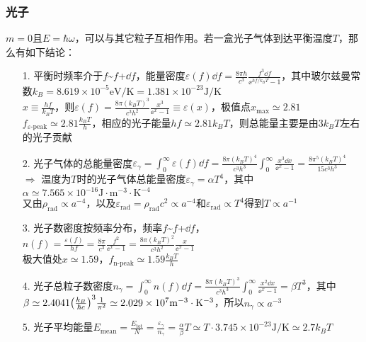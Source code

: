 \subsubsection{光子}
\par 
$m = 0$且$E = \hbar \omega$，可以与其它粒子互相作用。若一盒光子气体到达平衡温度$T$，那么有如下结论：
\begin{itemize}
	\item[1. ] 平衡时频率介于$f$\textasciitilde$f$+$\dd f$，能量密度$\varepsilon(f) \dd f =\frac{8 \pi h}{c^3} \frac{f^3 \dd f}{\ee^{h f/k_B T } - 1}$，其中玻尔兹曼常数$k_B = 8.619 \times 10^{-5} \mathrm{eV/K} = 1.381 \times 10^{-23} \mathrm{J/K}$ \\
	$x \equiv \frac{h f}{k_B T}$，则$\varepsilon(f) = \frac{8 \pi (k_B T)^3}{c^3 h^2} \frac{x^3}{\ee^x - 1} \equiv \varepsilon(x)$，极值点$x_{\text{max}} \simeq 2.81$ \\
	$f_{\text{$\varepsilon$-peak}} \simeq 2.81 \frac{k_B T}{h}$，相应的光子能量$h f \simeq 2.81 k_B T$，则总能量主要是由$3 k_B T$左右的光子贡献
	
	\item[2. ] 光子气体的总能量密度$\varepsilon_{\gamma} = \int_{0}^{\infty} \varepsilon(f) \dd f = \frac{8 \pi (k_B T)^4}{c^3 h^3} \int_{0}^{\infty} \frac{x^3 \dd x}{\ee^x - 1} = \frac{8 \pi^5 (k_B T)^4 }{15 c^3 h^3}$ \\
	$\Rightarrow$ 温度为$T$时的光子气体总能量密度$\varepsilon_{\gamma} = \alpha T^4$，其中$\alpha \simeq 7.565 \times 10^{-16} \mathrm{J \cdot m^{-3} \cdot K^{-4}}$ \\
	又由$\rho_{\text{rad}} \propto a^{-4}$，以及$\varepsilon_{\text{rad}} = \rho_{\text{rad}} c^2 \propto a^{-4}$和$\varepsilon_{\text{rad}} \propto T^4$得到$T \propto a^{-1}$
	
	\item[3. ] 光子数密度按频率分布，频率$f$\textasciitilde$f$+$\dd f$，$n(f) = \frac{\varepsilon(f)}{h f} = \frac{8 \pi}{c^3} \frac{f^2}{\ee^x - 1} =  \frac{8 \pi (k_B T)^2}{c^3 h^2} \frac{x}{\ee^x - 1} $ \\
	极大值处$x \simeq 1.59$，$f_{\text{n-peak}} \simeq 1.59 \frac{k_B T}{h}$
	
	\item[4. ] 光子总粒子数密度$n_{\gamma} = \int_0^{\infty} n(f) \dd f = \frac{8 \pi (k_B T)^3}{c^3 h^3} \int_{0}^{\infty} \frac{x^2 \dd x}{\ee^x - 1} = \beta T^3$，其中$\beta \simeq 2.4041 \qty(\frac{k_B}{\hbar c})^3 \frac{1}{\pi^2} \simeq 2.029 \times 10^{7} \mathrm{m^{-3} \cdot K^{-3}}$，所以$n_{\gamma} \propto a^{-3}$
	
	\item[5. ] 光子平均能量$E_{\text{mean}} = \frac{E_{\text{tot}}}{N} = \frac{\varepsilon_{\gamma}}{n_{\gamma}} = \frac{\alpha}{\beta} T \simeq T \cdot 3.745 \times 10^{-23} \mathrm{J/K} \simeq 2.7 k_B T$
	
\end{itemize}

